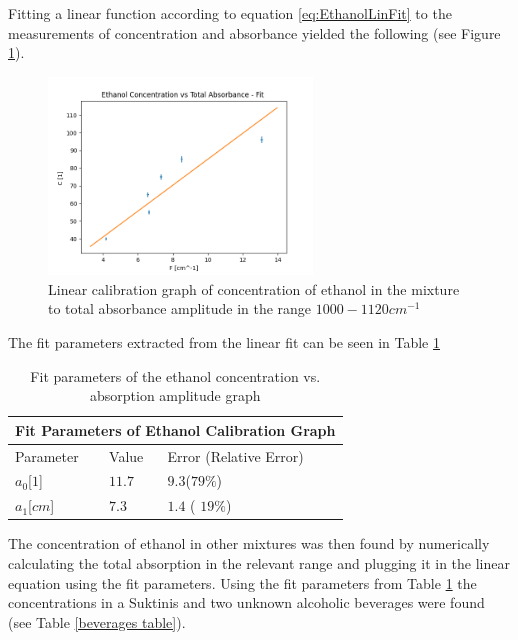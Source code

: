 \documentclass[reprint,amsmath,amssymb,aps, prl]{revtex4-2}
\begin{document}
Fitting a linear function according to equation \ref{eq:EthanolLinFit} to the measurements of concentration and absorbance yielded the following (see Figure \ref{fig:EthanolCalibration}).
    \begin{figure}[h]
    \includegraphics[width=7cm]{Images/linear_fittingethanol}
    \caption{Linear calibration graph of concentration of ethanol in the mixture to total absorbance amplitude in the range $1000-1120 cm^{-1}$}
    \label{fig:EthanolCalibration}
    \centering
\end{figure}
The fit parameters extracted from the linear fit can be seen in Table \ref{ethanol table}
\begin{table}[h]
\begin{tabular}{ |p{2cm}||p{2cm}|p{2cm}|  }
 \hline
 \multicolumn{3}{|c|}{Fit Parameters of Ethanol Calibration Graph} \\ \hline
 Parameter& Value &Error (Relative Error)\\ \hline
 $a_{0}$[$1$]    &$11.7$    &$9.3$($79\%$) \\
 $a_{1}$[$cm$] &$7.3$    & $1.4$ ( $19\%$)  \\ \hline
\end{tabular}
\caption{Fit parameters of the ethanol concentration vs. absorption amplitude graph}
\label{ethanol table}
\end{table}
The concentration of ethanol
in other mixtures was then found by numerically calculating the total absorption in the relevant range and plugging it in the linear equation using the fit parameters. Using the fit parameters from Table \ref{ethanol table} the concentrations in a Suktinis and two unknown alcoholic beverages were found (see Table \ref{beverages table}).
\end{document}
